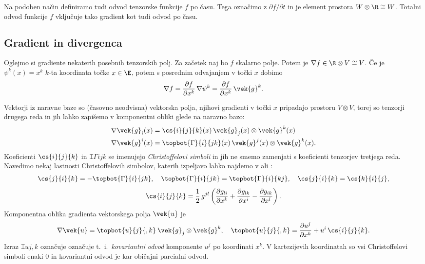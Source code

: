 Na podoben način definiramo tudi odvod tenzorske funkcije $f$ po času. Tega označimo z $\partial f/\partial t$
in je element prostora $W\otimes\R\cong W$. Totalni odvod funkcije $f$ vključuje tako gradient kot tudi odvod po času.

\subsection{Gradient in divergenca}

Oglejmo si gradiente nekaterih posebnih tenzorskih polj. Za začetek naj bo $f$ skalarno polje. Potem je
$\nabla f \in \R\otimes V \cong V$. Če je
$\psi^k(x)=x^k$ $k$-ta koordinata točke $x\in\E$, potem s posrednim odvajanjem v točki $x$ dobimo
\begin{equation*}
	\nabla f=\frac{\partial f}{\partial x^k}\,\nabla\psi^k=\frac{\partial f}{\partial x^k}\,\vek{g}^k.
\end{equation*}

Vektorji iz naravne baze so (časovno neodvisna) vektorska polja, njihovi gradienti v točki
$x$ pripadajo prostoru $V\otimes V$, torej
so tenzorji drugega reda in jih lahko zapišemo v komponentni obliki glede na naravno bazo:
\begin{align*}
	\nabla \vek{g}_i(x)&=\cs{i}{j}{k}(x)\,\vek{g}_j(x)\otimes\vek{g}^k(x)\\
	\nabla \vek{g}^i(x)&=\topbot{\Gamma}{i}{jk}(x)\,\vek{g}^j(x)\otimes\vek{g}^k(x).
\end{align*}
Koeficienti $\cs{i}{j}{k}$ in $\topbot{\Gamma}{i}{jk}$ se imenujejo \emph{Christoffelovi simboli} in
jih ne smemo zamenjati s koeficienti tenzorjev tretjega reda. Navedimo nekaj lastnosti Christoffelovih
simbolov, katerih izpeljavo lahko najdemo v \cite[str. 275--277]{liu} ali \cite[str. 59]{haupt}:
\begin{equation*}
	\cs{j}{i}{k}=-\topbot{\Gamma}{i}{jk},\quad \topbot{\Gamma}{i}{jk}=\topbot{\Gamma}{i}{kj},\quad
	\cs{j}{i}{k}=\cs{k}{i}{j},
\end{equation*}
\begin{equation*}
	\cs{i}{j}{k}=\frac{1}{2}\,g^{jl}\left(\frac{\partial g_{li}}{\partial x^k}+
	\frac{\partial g_{lk}}{\partial x^i}-\frac{\partial g_{ik}}{\partial x^l}\right).
\end{equation*}
Komponentna oblika gradienta vektorskega polja $\vek{u}$ je
\begin{equation*}
	\nabla\vek{u}= \topbot{u}{j}{,k}\:\vek{g}_j\otimes\vek{g}^k,\quad
	\topbot{u}{j}{,k}=\frac{\partial u^j}{\partial x^k}+u^i\,\cs{i}{j}{k}.
\end{equation*}
Izraz $\topbot{u}{j}{,k}$ označuje označuje t.~i.~\emph{kovariantni odvod} komponente $u^j$
po koordinati $x^k$. V kartezijevih koordinatah so vsi Christoffelovi simboli enaki 0 in
kovariantni odvod je kar običajni parcialni odvod.

